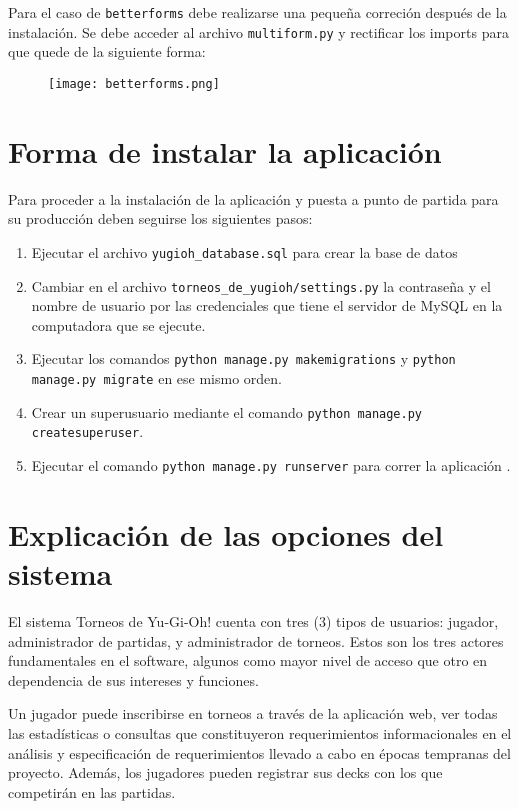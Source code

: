 \documentclass[12pt]{article}
\begin{document}
	Para el caso de \verb|betterforms| debe realizarse una peque\~{n}a correci\'on despu\'es de la instalación. Se debe acceder al archivo \verb|multiform.py| y rectificar los imports para que quede de la siguiente forma:
	
		\begin{figure}[h]
			\begin{center}
				\texttt{[image: betterforms.png]}
			\end{center}
		\end{figure}
	
	\section{Forma de instalar la aplicaci\'on}
	
	Para proceder a la instalación de la aplicación y puesta a punto de partida para su producción deben seguirse los siguientes pasos:
	
	\begin{enumerate}
		\item Ejecutar el archivo \verb|yugioh_database.sql| para crear la base de datos
		\item Cambiar en el archivo \verb|torneos_de_yugioh/settings.py| la contrase\~{n}a y el nombre de usuario  por las credenciales  que tiene el servidor de MySQL en la computadora que se ejecute.
		\item Ejecutar los comandos \verb|python manage.py makemigrations| y \verb|python manage.py migrate| en ese mismo orden.
		\item Crear un superusuario mediante el comando \verb|python manage.py createsuperuser|.
		\item Ejecutar el comando \verb|python manage.py runserver| para correr la aplicaci\'on .
	\end{enumerate}
	
	\section{Explicaci\'on de las opciones del sistema}

    El sistema Torneos de Yu-Gi-Oh! cuenta con tres (3) tipos de usuarios: jugador, administrador de partidas, y administrador de torneos. Estos son los tres actores fundamentales en el software, algunos como mayor nivel de acceso que otro en dependencia de sus intereses y funciones.

    Un jugador puede inscribirse en torneos a través de la aplicación web, ver todas las estadísticas o consultas que constituyeron requerimientos informacionales en el análisis y especificación de requerimientos llevado a cabo en épocas tempranas del proyecto. Además, los jugadores pueden registrar sus decks con los que competirán en las partidas. 
\end{document}
